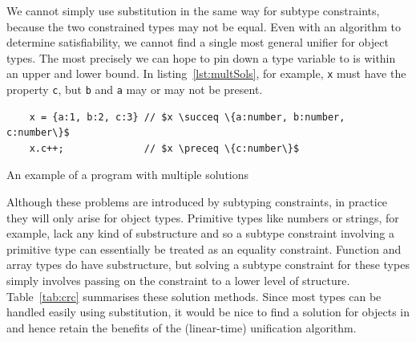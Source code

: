 \documentclass[12pt,a4paper,twoside,openright]{report}
\theoremstyle{definition}
\theoremstyle{dotless}
\newcommand*{\js}{\texttt}
\begin{document}
We cannot simply use substitution in the same way for subtype constraints,
because the two constrained types may not be equal. Even with an algorithm to
determine satisfiability, we cannot find a single most general unifier for
object types.  The most precisely we can hope to pin down a type variable to is
within an upper and lower bound.  In listing~\ref{lst:multSols}, for example,
\js{x} must have the property \js{c}, but \js{b} and \js{a} may or may not be
present.  

\begin{program}[H]
  \begin{verbatim}
	x = {a:1, b:2, c:3} // $x \succeq \{a:number, b:number, c:number\}$
	x.c++;              // $x \preceq \{c:number\}$
  \end{verbatim}
  \caption{An example of a program with multiple solutions}\label{lst:multSols}
\end{program}

Although these problems are introduced by subtyping constraints, in practice
they will only arise for object types. Primitive types like numbers or strings,
for example, lack any kind of substructure and so a subtype constraint
involving a primitive type can essentially be treated as an equality
constraint. Function and array types do have substructure, but solving a
subtype constraint for these types simply involves passing on the constraint to
a lower level of structure. Table~\ref{tab:crc} summarises these solution
methods. Since most types can be handled easily using substitution, it would be
nice to find a solution for objects in and hence retain the benefits of the
(linear-time) unification algorithm. 
\end{document}
